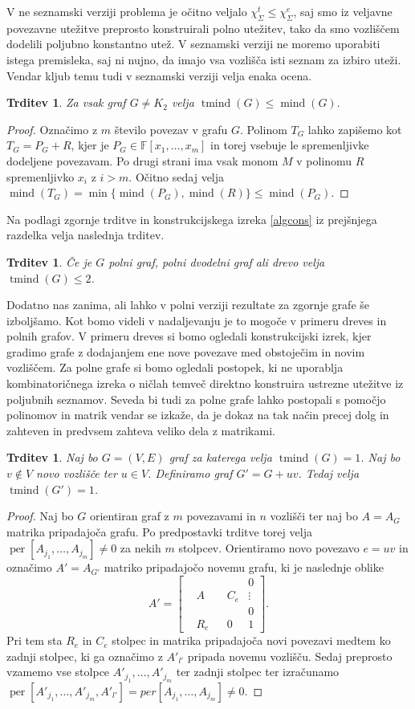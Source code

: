 \documentclass[12pt,a4paper,twoside]{article}
\theoremstyle{definition} %
\theoremstyle{plain} %
\newtheorem{trditev}[definicija]{Trditev}
\newcommand{\ec}{\chi_{\Sigma}^e}
\newcommand{\ect}{\chi_{\Sigma}^t}
\numberwithin{equation}{section}  %
\DeclareMathOperator{\per}{per}
\DeclareMathOperator{\mind}{mind}
\DeclareMathOperator{\tmind}{tmind}
\begin{document}
V ne seznamski verziji problema je očitno veljalo $\ect \le \ec$, saj smo iz veljavne povezavne utežitve preprosto konstruirali polno utežitev, tako da smo vozliščem dodelili poljubno konstantno utež. V seznamski verziji ne moremo uporabiti istega premisleka, saj ni nujno, da imajo vsa vozlišča isti seznam za izbiro uteži. Vendar kljub temu tudi v seznamski verziji velja enaka ocena.
\begin{trditev}
Za vsak graf $G \neq K_2$ velja $\tmind(G) \le \mind(G).$
\end{trditev}
\begin{proof}
Označimo z $m$ število povezav v grafu $G$. Polinom $T_G$ lahko zapišemo kot $T_G = P_G + R$, kjer je $P_G \in \mathbb{F}[x_1, \ldots, x_m]$ in torej vsebuje le spremenljivke dodeljene povezavam. Po drugi strani ima vsak monom $M$ v polinomu $R$ spremenljivko $x_i$ z $i > m$. Očitno sedaj velja $\mind(T_G) = \min \{\mind(P_G),\mind(R)\} \le \mind(P_G)$.
\end{proof}
Na podlagi zgornje trditve in konstrukcijskega izreka \ref{algcons} iz prejšnjega razdelka velja naslednja trditev.
\begin{trditev}
Če je $G$ polni graf, polni dvodelni graf ali drevo velja $\tmind(G) \le 2$.
\end{trditev}
Dodatno nas zanima, ali lahko v polni verziji rezultate za zgornje grafe še izboljšamo. Kot bomo videli v nadaljevanju je to mogoče v primeru dreves in polnih grafov. V primeru dreves si bomo ogledali konstrukcijski izrek, kjer gradimo grafe z dodajanjem ene nove povezave med obstoječim in novim  vozliščem. Za polne grafe si bomo ogledali postopek, ki ne uporablja kombinatoričnega izreka o ničlah temveč direktno konstruira ustrezne utežitve iz poljubnih seznamov. Seveda bi tudi za polne grafe lahko postopali s pomočjo polinomov in matrik vendar se izkaže, da je dokaz na tak način precej dolg in zahteven in predvsem zahteva veliko dela z matrikami.
\begin{trditev}
Naj bo $G=(V,E)$ graf za katerega velja $\tmind(G) = 1$. Naj bo $v \notin V$ novo vozlišče ter $u \in V$. Definiramo graf $G' = G + uv$. Tedaj velja $\tmind(G') =1$.
\end{trditev}
 \begin{proof}
Naj bo $G$ orientiran graf z $m$ povezavami in $n$ vozlišči ter naj bo $A = A_G$ matrika pripadajoča grafu. Po predpostavki trditve torej velja $\per[A_{j_1}, \ldots, A_{j_m}]  \neq 0$ za nekih $m$ stolpcev. Orientiramo novo povezavo $e = uv$ in označimo $A' = A_{G'}$ matriko pripadajočo novemu grafu, ki je naslednje oblike
$$
A' = \left[ \begin{matrix}
  &  &  &  & 0 \\
  & A &  & C_e & \vdots \\
  &  &  &  & 0 \\ 
 & R_e &  & 0 & 1 
\end{matrix} \right].
$$
Pri tem sta $R_e$ in $C_e$ stolpec in matrika pripadajoča novi povezavi medtem ko zadnji stolpec, ki ga označimo z $A'_{l'}$ pripada novemu vozlišču. Sedaj preprosto vzamemo vse stolpce $A'_{j_1}, \ldots, A'_{j_m}$ ter zadnji stolpec ter izračunamo 
$\per[A'_{j_1}, \ldots, A'_{j_m}, A'_{l'} ] = per[A_{j_1}, \ldots, A_{j_m}]  \neq 0$.
\end{proof}
\end{document}
